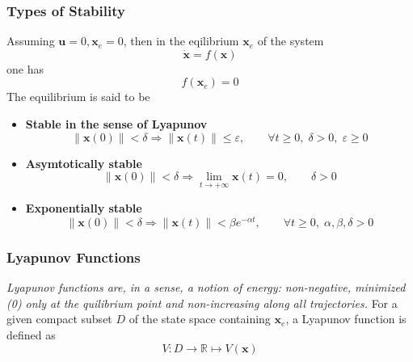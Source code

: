 \subsubsection{Types of Stability}
Assuming $\mathbf{u}=0, \mathbf{x}_e=0$, then in the eqilibrium $\mathbf{x}_e$ of the system
\begin{equation*}
    \dot{\mathbf{x}} = f(\mathbf{x})
\end{equation*}
one has
\noindent\begin{equation*}
    f(\mathbf{x}_e) = 0
\end{equation*}
The equilibrium is said to be
\begin{itemize}
    \item \textbf{Stable in the sense of Lyapunov}
          \noindent\begin{equation*}
              \|\mathbf{x}(0)\| < \delta \Rightarrow \|\mathbf{x}(t)\| \leq \varepsilon,\qquad \forall t\geq 0,\; \delta > 0,\; \varepsilon\geq0
          \end{equation*}
    \item \textbf{Asymtotically stable}
          \noindent\begin{equation*}
              \|\mathbf{x}(0)\| < \delta \Rightarrow \lim_{t\to +\infty} \mathbf{x}(t)=0, \qquad \delta>0
          \end{equation*}
    \item \textbf{Exponentially stable}
          \noindent\begin{equation*}
              \|\mathbf{x}(0)\| < \delta \Rightarrow \|\mathbf{x}(t)\| < \beta e^{-\alpha t}, \qquad \forall t\geq 0,\; \alpha, \beta, \delta >0
          \end{equation*}
\end{itemize}

\subsubsection{Lyapunov Functions}
\textit{Lyapunov functions are, in a sense, a notion of energy: non-negative, minimized (0) only at the quilibrium point and non-increasing along all trajectories.}
\newpar{}
For a given compact subset $D$ of the state space containing $\mathbf{x}_e$, a Lyapunov function is defined as
\noindent\begin{equation*}
    V:D \to \mathbb{R} \mapsto V(\mathbf{x})
\end{equation*}

